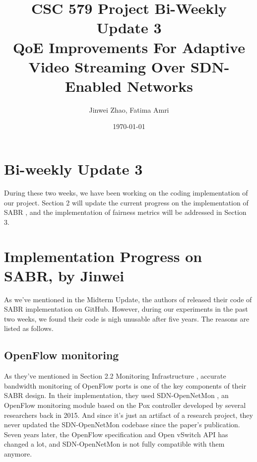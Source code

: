 \documentclass{article}
\begin{document}
\title{\textbf{CSC 579 Project Bi-Weekly Update 3 \protect\\ QoE Improvements For Adaptive Video Streaming Over SDN-Enabled Networks}}

\author{Jinwei Zhao, Fatima Amri}

\date{\today}

\maketitle

\section{Bi-weekly Update 3}
During these two weeks, we have been working on the coding implementation of our project. Section 2 will update the current progress on the implementation of SABR \cite{bhat_network_2017}, and the implementation of fairness metrics \cite{mu_scalable_2016} will be addressed in Section 3. 

\section{Implementation Progress on SABR, by Jinwei}
As we've mentioned in the Midterm Update, the authors of \cite{bhat_network_2017} released their code of SABR implementation on GitHub. However, during our experiments in the past two weeks, we found their code is nigh unusable after five years. The reasons are listed as follows.

\subsection{OpenFlow monitoring}
As they've mentioned in Section 2.2 Monitoring Infrastructure \cite{bhat_network_2017}, accurate bandwidth monitoring of OpenFlow ports is one of the key components of their SABR design. In their implementation, they used SDN-OpenNetMon \cite{openmon}, an OpenFlow monitoring module based on the Pox controller developed by several researchers back in 2015. And since it's just an artifact of a research project, they never updated the SDN-OpenNetMon codebase since the paper's publication. Seven years later, the OpenFlow specification and Open vSwitch API has changed a lot, and SDN-OpenNetMon is not fully compatible with them anymore. 
\end{document}
